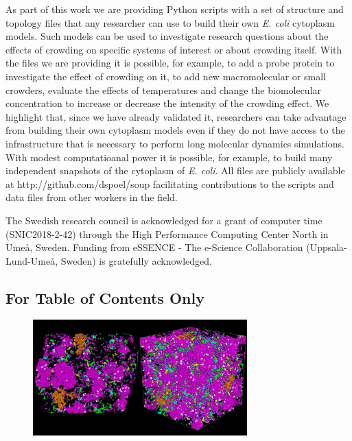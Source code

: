 \documentclass[journal=jpcisd8,manuscript=article]{achemso}
\begin{document}
As part of this work we are providing Python scripts with a set of
structure and topology files that any researcher can use to build
their own \textit{E. coli} cytoplasm models. Such models can be used
to investigate research questions about the effects of crowding on
specific systems of interest or about crowding itself. With the files
we are providing it is possible, for example, to add a probe protein
to investigate the effect of crowding on it, to add new macromolecular
or small crowders, evaluate the effects of temperatures and change the
biomolecular concentration to increase or decrease the intensity of
the crowding effect. We highlight that, since we have already
validated it, researchers can take advantage from building their own
cytoplasm models even if they do not have access to the infrastructure
that is necessary to perform long molecular dynamics simulations. With
modest computatioanal power it is possible, for example, to build many
independent snapshots of the cytoplasm of \textit{E. coli}. All files
are publicly available at http://github.com/dspoel/soup facilitating
contributions to the scripts and data files from other workers in the field.

\begin{acknowledgement}
The Swedish research council is acknowledged for a grant of computer time
(SNIC2018-2-42) through the High Performance Computing
Center North in Ume{\aa}, Sweden. Funding from eSSENCE - The e-Science
Collaboration (Uppsala-Lund-Ume{\aa}, Sweden) is gratefully acknowledged.
\end{acknowledgement}

 


\subsection*{For Table of Contents Only}
\begin{figure}[htp] 
 \centering
  \includegraphics[height=4.45cm]{soup-toc.pdf}
\end{figure}
 
\end{document}
